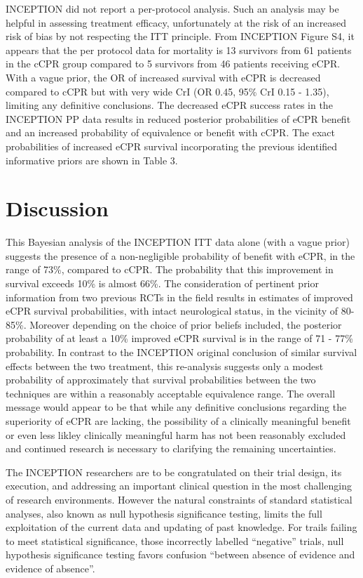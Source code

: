 \documentclass[
  super,
  preprint,
  3p]{elsarticle}
\begin{document}
INCEPTION did not report a per-protocol analysis. Such an analysis may
be helpful in assessing treatment efficacy, unfortunately at the risk of
an increased risk of bias by not respecting the ITT principle. From
INCEPTION Figure S4\citep{CPR2023a}, it appears that the per protocol
data for mortality is 13 survivors from 61 patients in the cCPR group
compared to 5 survivors from 46 patients receiving eCPR. With a vague
prior, the OR of increased survival with eCPR is decreased compared to
cCPR but with very wide CrI (OR 0.45, 95\% CrI 0.15 - 1.35), limiting
any definitive conclusions. The decreased eCPR success rates in the
INCEPTION PP data results in reduced posterior probabilities of eCPR
benefit and an increased probability of equivalence or benefit with
cCPR. The exact probabilities of increased eCPR survival incorporating
the previous identified informative priors are shown in Table 3.

\hypertarget{discussion}{%
\section{Discussion}\label{discussion}}

This Bayesian analysis of the INCEPTION ITT data alone (with a vague
prior) suggests the presence of a non-negligible probability of benefit
with eCPR, in the range of 73\%, compared to cCPR. The probability that
this improvement in survival exceeds 10\% is almost 66\%. The
consideration of pertinent prior information from two previous
RCTs\citep{RN6751, RN6759} in the field results in estimates of improved
eCPR survival probabilities, with intact neurological status, in the
vicinity of 80-85\%. Moreover depending on the choice of prior beliefs
included, the posterior probability of at least a 10\% improved eCPR
survival is in the range of 71 - 77\% probability. In contrast to the
INCEPTION original conclusion of similar survival effects between the
two treatment, this re-analysis suggests only a modest probability of
approximately that survival probabilities between the two techniques are
within a reasonably acceptable equivalence range. The overall message
would appear to be that while any definitive conclusions regarding the
superiority of eCPR are lacking, the possibility of a clinically
meaningful benefit or even less likley clinically meaningful harm has
not been reasonably excluded and continued research is necessary to
clarifying the remaining uncertainties.

The INCEPTION researchers are to be congratulated on their trial design,
its execution, and addressing an important clinical question in the most
challenging of research environments. However the natural constraints of
standard statistical analyses, also known as null hypothesis
significance testing, limits the full exploitation of the current data
and updating of past knowledge. For trails failing to meet statistical
significance, those incorrectly labelled ``negative'' trials, null
hypothesis significance testing favors confusion ``between absence of
evidence and evidence of absence''\citep{RN6765}.
\end{document}
